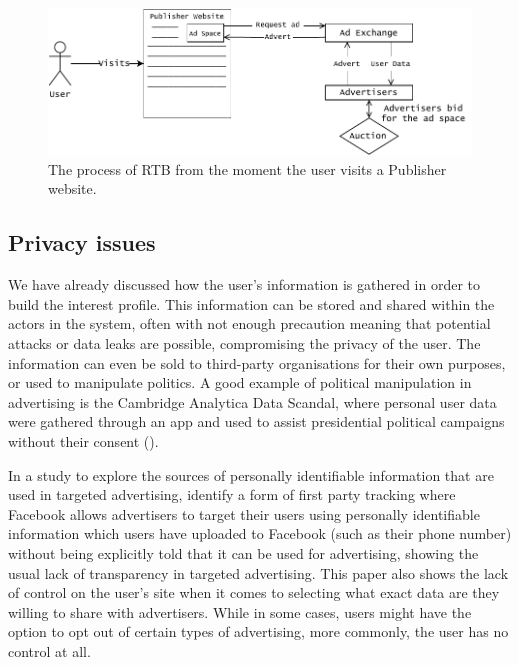 \documentclass{l4proj}
\begin{document}
\begin{figure}
    \centering
    \includegraphics[width=1\linewidth]{images/RTB.pdf}    

    \caption{The process of RTB from the moment the user visits a Publisher website. }

    \label{fig:rtb} 
\end{figure}

\subsection{Privacy issues}
We have already discussed how the user's information is gathered in order to build the interest profile. This information can be stored and shared within the actors in the system, often with not enough precaution meaning that potential attacks or data leaks are possible, compromising the privacy of the user. The information can even be sold to third-party organisations for their own purposes, or used to manipulate politics. A good example of political manipulation in advertising is the Cambridge Analytica Data Scandal, where personal user data were gathered through an app and used to assist presidential political campaigns without their consent (\cite{cambridge}).

In a study to explore the sources of personally identifiable information that are used in targeted advertising, \cite{Venkatadri2019} identify a form of first party tracking where Facebook allows advertisers to target their users using personally identifiable information which users have uploaded to Facebook (such as their phone number) without being explicitly told that it can be used for advertising, showing the usual lack of transparency in targeted advertising. This paper also shows the lack of control on the user's site when it comes to selecting what exact data are they willing to share with advertisers. While in some cases, users might have the option to opt out of certain types of advertising, more commonly, the user has no control at all.
\end{document}
